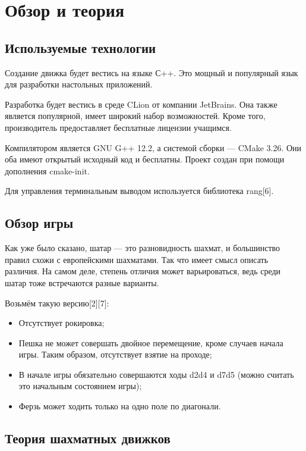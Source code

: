 {

	\chapter{Обзор и теория}
	\section{Используемые технологии}
	Создание движка будет вестись на языке С++. Это мощный и  популярный язык для разработки настольных приложений.
	
	Разработка будет вестись в среде CLion от компании JetBrains. Она также является популярной, имеет широкий набор возможностей. Кроме того, производитель предоставляет бесплатные лицензии учащимся. 
	
	Компилятором является GNU G++ 12.2, а системой сборки --- CMake 3.26. Они оба имеют открытый исходный код и бесплатны. Проект создан при помощи дополнения cmake-init.
	
	Для управления терминальным выводом используется библиотека rang[6].
	
	\section{Обзор игры}
	
	Как уже было сказано, шатар --- это разновидность шахмат, и большинство правил схожи с европейскими шахматами. Так что имеет смысл описать различия.
	На самом деле, степень отличия может варьироваться, ведь среди шатар тоже встречаются разные варианты. 
	
	Возьмём такую версию[2][7]:
	
	\begin{itemize}
		\item Отсутствует рокировка;
		\item Пешка не может совершать двойное перемещение, кроме случаев начала игры. Таким образом, отсутствует взятие на проходе;
		\item В начале игры обязательно совершаются ходы d2d4 и d7d5 (можно считать это начальным состоянием игры);
		\item  Ферзь может ходить только на одно поле по диагонали.
	\end{itemize}
	
	\section{Теория шахматных движков}
	
}
